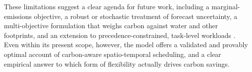 These limitations suggest a clear agenda for future work, including a marginal-emissions objective, a robust or stochastic treatment of forecast uncertainty, a multi-objective formulation that weighs carbon against water and other footprints, and an extension to precedence-constrained, task-level workloads \citep{lechowicz2025pcaps, attenni2024shifting}. Even within its present scope, however, the model offers a validated and provably optimal account of carbon-aware spatio-temporal scheduling, and a clear empirical answer to which form of flexibility actually drives carbon savings.
